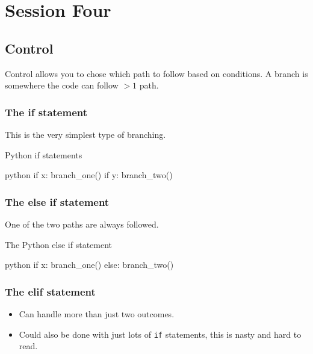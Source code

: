 \section{Session Four}\label{sec:session_four}

\subsection{Control}\label{sub:control}

Control allows you to chose which path to follow based on conditions.
A branch is somewhere the code can follow \(>1\) path.

\subsubsection{The if statement}\label{ssub:the-if-statement}

This is the very simplest type of branching.
\begin{highlight}{Python if statements}
    \begin{code}{python}
        if x:
        branch_one()
        if y:
        branch_two()
    \end{code}
\end{highlight}

\subsubsection{The else if statement}\label{ssub:the-else-if-statement}

One of the two paths are always followed.
\begin{highlight}{The Python else if statement}
    \begin{code}{python}
        if x:
        branch_one()
        else:
        branch_two()
    \end{code}
\end{highlight}

\subsubsection{The elif statement}\label{ssub:the-elif-statement}

\begin{itemize}
    \item Can handle more than just two outcomes.
    \item Could also be done with just lots of \texttt{if} statements, this is nasty and hard to read.
\end{itemize}

